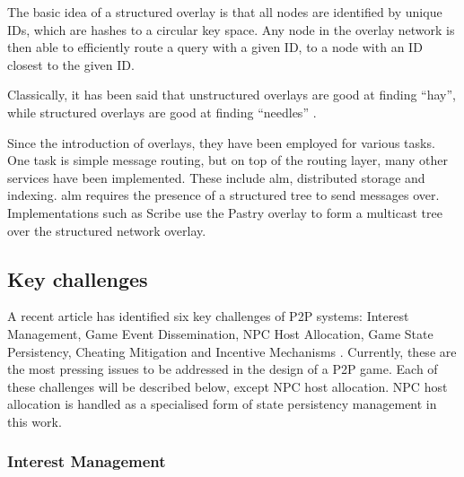 \documentclass[10pt,a4paper,journal,cspaper,compsoc]{IEEEtran}
\begin{document}
The basic idea of a structured overlay is that all nodes are identified by unique IDs, which are hashes to a circular key space. Any node in the
overlay network is then able to efficiently route a query with a given ID, to a node with an ID closest to the given ID.

Classically, it has been said that unstructured overlays are good at finding ``hay'', while structured overlays are good at finding ``needles''
\cite{Rodrigues_acm_comms_p2p}.

Since the introduction of overlays, they have been employed for various tasks. One task is simple message routing, but on top of the routing layer,
many other services have been implemented. These include \ac{alm}, distributed storage \cite{past_storage_focus} and indexing. \ac{alm} requires the
presence of a structured tree to send messages over. Implementations such as Scribe use the Pastry overlay to form a multicast tree over the
structured network overlay.

\subsection{Key challenges}
\label{key_challenges}

A recent article has identified six key challenges of P2P systems: Interest Management, Game Event Dissemination, NPC Host Allocation, Game State
Persistency, Cheating Mitigation and Incentive Mechanisms \cite{Fan_deisgn_issues_p2p}. Currently, these are the most pressing issues to be addressed
in the design of a P2P game. Each of these challenges will be described below, except NPC host allocation. NPC host allocation is handled as a
specialised form of state persistency management in this work.



\subsubsection{Interest Management}
\label{key_challenges_im}
\end{document}
